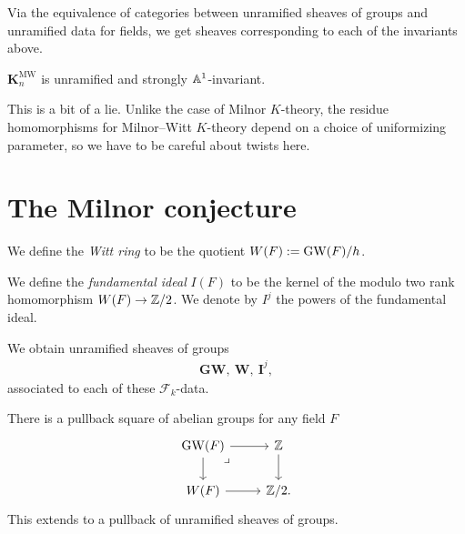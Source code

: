 \documentclass[11pt,openany]{book}
\providecommand{\KMW}{\mathbf{K}^\mathrm{MW}}
\begin{document}
Via the equivalence of categories between unramified sheaves of groups and unramified data for fields, we get sheaves corresponding to each of the invariants above.

\begin{proposition} \cite[p.~71]{Morel}
$\KMW_n$ is unramified and strongly $\mathbb{A}^1$-invariant.
\end{proposition}

\begin{warning} This is a bit of a lie. Unlike the case of Milnor $K$-theory, the residue homomorphisms for Milnor--Witt $K$-theory depend on a choice of uniformizing parameter, so we have to be careful about twists here.
\end{warning}


\section{The Milnor conjecture}

\begin{definition} We define the \textit{Witt ring} to be the quotient $W(F) := \mathrm{GW}(F)/h$.
\end{definition}

\begin{definition} We define the \textit{fundamental ideal} $I(F)$ to be the kernel of the modulo two rank homomorphism $W(F) \to \mathbb{Z}/2$. We denote by $I^j$ the powers of the fundamental ideal.
\end{definition}

\begin{proposition} We obtain unramified sheaves of groups
\begin{align*}
    \mathbf{GW},\ \mathbf{W},\ \mathbf{I}^j,
\end{align*}
associated to each of these $\mathcal{F}_k$-data.
\end{proposition}

\begin{proposition}\label{prop:GW-pullback} 
There is a pullback square of abelian groups for any field $F$
\[ \begin{tikzcd}
    \GW(F)\rar\dar\pb & \Z\dar\\
    W(F)\rar & \Z/2.
\end{tikzcd} \]
This extends to a pullback of unramified sheaves of groups.
\end{proposition}
\end{document}
